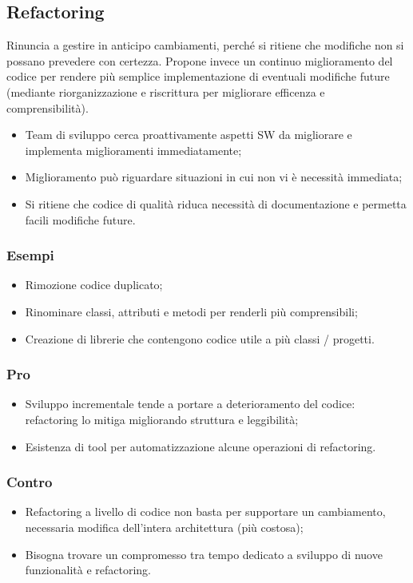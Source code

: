 \documentclass{article}
\begin{document}
    \subsection{Refactoring}
      Rinuncia a gestire in anticipo cambiamenti, perché si ritiene che modifiche non si possano prevedere con certezza. Propone invece un continuo miglioramento del codice per rendere più semplice implementazione di eventuali modifiche future (mediante riorganizzazione e riscrittura per migliorare efficenza e comprensibilità).
      \begin{itemize}
        \item Team di sviluppo cerca proattivamente aspetti SW da migliorare e implementa miglioramenti immediatamente;
        \item Miglioramento può riguardare situazioni in cui non vi è necessità immediata;
        \item Si ritiene che codice di qualità riduca necessità di documentazione e permetta facili modifiche future.
      \end{itemize}
      \subsubsection{Esempi}
        \begin{itemize}
          \item Rimozione codice duplicato;
          \item Rinominare classi, attributi e metodi per renderli più comprensibili;
          \item Creazione di librerie che contengono codice utile a più classi / progetti.
        \end{itemize}
      \subsubsection{Pro}
        \begin{itemize}
          \item Sviluppo incrementale tende a portare a deterioramento del codice: refactoring lo mitiga migliorando struttura e leggibilità;
          \item Esistenza di tool per automatizzazione alcune operazioni di refactoring.
        \end{itemize}
      \subsubsection{Contro}
        \begin{itemize}
          \item Refactoring a livello di codice non basta per supportare un cambiamento, necessaria modifica dell'intera architettura (più costosa);
          \item Bisogna trovare un compromesso tra tempo dedicato a sviluppo di nuove funzionalità e refactoring.
        \end{itemize}
\end{document}
